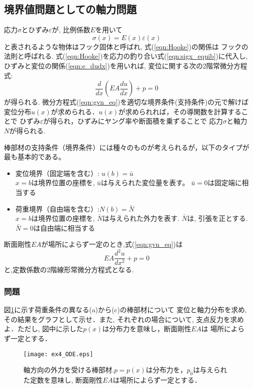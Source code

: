 \documentclass[10pt,a4j]{jarticle}
\begin{document}
\subsection{境界値問題としての軸力問題}
応力$\sigma$とひずみ$\varepsilon$が, 比例係数$E$を用いて
\begin{equation}
	\sigma(x) =E(x) \varepsilon (x)
	\label{eqn:Hooke}
\end{equation}
と表されるような物体はフック固体と呼ばれ, 式(\ref{eqn:Hooke})の関係は
フックの法則と呼ばれる. 式(\ref{eqn:Hooke})を応力の釣り合い式(\ref{eqn:sigx_equib})に代入し, 
ひずみと変位の関係(\ref{eqn:e_dudx})を用いれば, 
変位に関する次の2階常微分方程式:
\begin{equation}
	\frac{d}{dx}\left( EA \frac{du}{dx} \right)+p=0
	\label{eqn:gvn_eq}
\end{equation}
が得られる. 微分方程式(\ref{eqn:gvn_eq})を適切な境界条件(支持条件)の元で解けば
変位分布$u(x)$が求められる．$u(x)$が求められれば，その導関数を計算することで
ひずみ$\varepsilon$が得られ，ひずみにヤング率や断面積を乗ずることで
応力$\sigma$と軸力$N$が得られる.

棒部材の支持条件（境界条件）には種々のものが考えられるが，以下のタイプが最も基本的である。
\begin{itemize}
\item
変位境界（固定端を含む）: $u(b)=\bar{u}$\\
	$x=b$は境界位置の座標を, $\bar u$は与えられた変位量を表す。
	$\bar u=0$は固定端に相当する
\item
荷重境界（自由端を含む）:$N(b)=\bar{N}$\\
	 $x=b$は境界位置の座標を, $\bar N$は与えられた外力を表す.
	$\bar{N}$は, 引張を正とする. $\bar N=0$は自由端に相当する
\end{itemize}
断面剛性$EA$が場所によらず一定のとき,式(\ref{eqn:gvn_eq})は
\begin{equation}
	EA\frac{d^2u}{dx^2}+p=0
	\label{eqn:gvn_eq2}
\end{equation}
と,定数係数の2階線形常微分方程式となる.
\subsubsection{問題}
図\ref{fig:fig4}に示す荷重条件の異なる(a)から(c)の棒部材について
変位と軸力分布を求め, その結果をグラフとして示せ．また, それぞれの場合について, 
支点反力を求めよ．ただし, 図中に示した$p(x)$は分布力を意味し，断面剛性$EA$は
場所によらず一定とする．
\begin{figure}[h]
	\begin{center}
	\texttt{[image: ex4\_ODE.eps]} 
	\end{center}
	\caption{軸方向の外力を受ける棒部材.$p=p(x)$は分布力を，$p_0$は与えられた定数を意味し, 
	断面剛性$EA$は場所によらず一定とする．} 
	\label{fig:fig4}
\end{figure}
\clearpage
\end{document}
